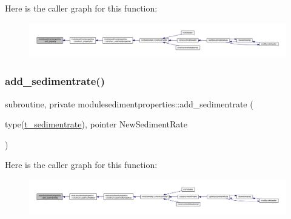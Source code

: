 Here is the caller graph for this function\+:\nopagebreak
\begin{figure}[H]
\begin{center}
\leavevmode
\includegraphics[width=350pt]{namespacemodulesedimentproperties_a6c62c3f418883d0d880c6158695566b6_icgraph}
\end{center}
\end{figure}
\mbox{\label{namespacemodulesedimentproperties_a01426b1d7936843c8ff328ebd6feba46}} 
\subsubsection{\texorpdfstring{add\+\_\+sedimentrate()}{add\_sedimentrate()}}
{\footnotesize\ttfamily subroutine, private modulesedimentproperties\+::add\+\_\+sedimentrate (\begin{DoxyParamCaption}\item[{type(\mbox{\hyperlink{structmodulesedimentproperties_1_1t__sedimentrate}{t\+\_\+sedimentrate}}), pointer}]{New\+Sediment\+Rate }\end{DoxyParamCaption})\hspace{0.3cm}{\ttfamily [private]}}

Here is the caller graph for this function\+:\nopagebreak
\begin{figure}[H]
\begin{center}
\leavevmode
\includegraphics[width=350pt]{namespacemodulesedimentproperties_a01426b1d7936843c8ff328ebd6feba46_icgraph}
\end{center}
\end{figure}
\mbox{\label{namespacemodulesedimentproperties_ad4e53e8aa65867e0dd71960c0df2dc06}} 
